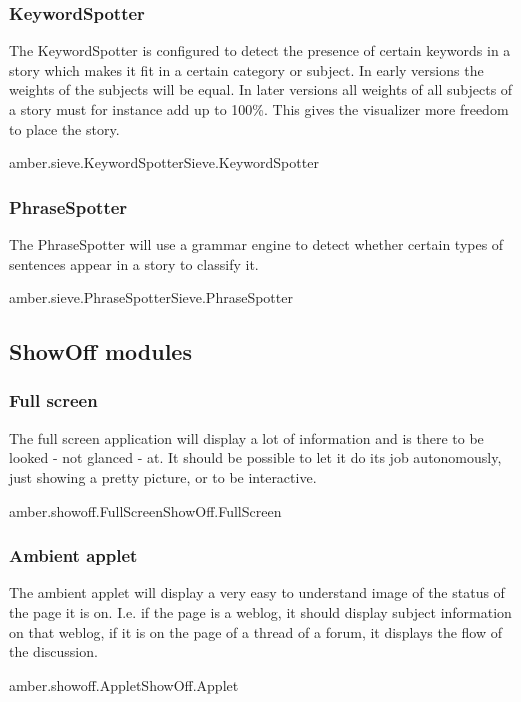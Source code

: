 \subsubsection{KeywordSpotter}

The KeywordSpotter is configured to detect the presence of certain keywords in
a story which makes it fit in a certain category or subject. In early versions
the weights of the subjects will be equal. In later versions all weights of all
subjects of a story must for instance add up to 100\%. This gives the
visualizer more freedom to place the story.

\begin{module}{amber.sieve.KeywordSpotter}{Sieve.KeywordSpotter}
\end{module}

\subsubsection{PhraseSpotter}

The PhraseSpotter will use a grammar engine to detect whether certain types of
sentences appear in a story to classify it.

\begin{module}{amber.sieve.PhraseSpotter}{Sieve.PhraseSpotter}
\end{module}

\subsection{ShowOff modules}

\subsubsection{Full screen}

The full screen application will display a lot of information and is there to
be looked - not glanced - at. It should be possible to let it do its job
autonomously, just showing a pretty picture, or to be interactive.

\begin{module}{amber.showoff.FullScreen}{ShowOff.FullScreen}
\end{module}

\subsubsection{Ambient applet}

The ambient applet will display a very easy to understand image of the status
of the page it is on. I.e. if the page is a weblog, it should display subject
information on that weblog, if it is on the page of a thread of a forum, it
displays the flow of the discussion.

\begin{module}{amber.showoff.Applet}{ShowOff.Applet}
\end{module}

